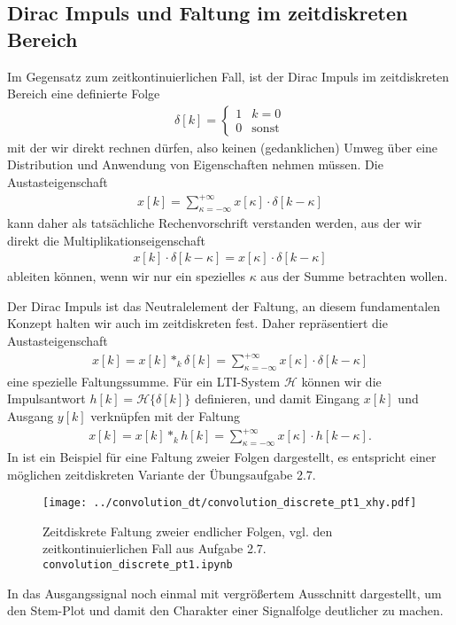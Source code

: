 \subsection*{Dirac Impuls und Faltung im zeitdiskreten Bereich}
Im Gegensatz zum zeitkontinuierlichen Fall, ist der Dirac Impuls im zeitdiskreten
Bereich eine definierte Folge
\begin{align}
\delta[k] =
\begin{cases}
1 & k=0\\
0 & \text{sonst}
\end{cases}
\end{align}
mit der wir direkt rechnen dürfen, also keinen (gedanklichen) Umweg über
eine Distribution und Anwendung von Eigenschaften nehmen müssen.
%
Die Austasteigenschaft
\begin{align}
x[k] = \sum_{\kappa=-\infty}^{+\infty} x[\kappa]
\cdot \delta[k-\kappa]
\end{align}
kann daher als tatsächliche Rechenvorschrift verstanden werden, aus der wir
direkt die Multiplikationseigenschaft
\begin{align}
x[k] \cdot \delta[k-\kappa] = x[\kappa] \cdot \delta[k-\kappa]
\end{align}
ableiten können, wenn wir nur ein spezielles $\kappa$ aus der Summe betrachten
wollen.

Der Dirac Impuls ist das Neutralelement der Faltung, an diesem fundamentalen
Konzept halten wir auch im zeitdiskreten fest. Daher repräsentiert die
Austasteigenschaft
\begin{align}
x[k] = x[k] \ast_k \delta[k] = \sum_{\kappa=-\infty}^{+\infty} x[\kappa]
\cdot \delta[k-\kappa]
\end{align}
eine spezielle Faltungssumme. Für ein LTI-System $\mathcal{H}$ können wir
die Impulsantwort $h[k]=\mathcal{H}\{\delta[k]\}$ definieren, und damit
Eingang $x[k]$ und Ausgang $y[k]$ verknüpfen mit der Faltung
\begin{align}
x[k] = x[k] \ast_k h[k] = \sum_{\kappa=-\infty}^{+\infty} x[\kappa]
\cdot h[k-\kappa].
\end{align}
%
In  ist ein Beispiel für eine Faltung
zweier Folgen dargestellt, es entspricht einer möglichen zeitdiskreten
Variante der Übungsaufgabe 2.7.
%
\begin{figure}[b]
\centering
\texttt{[image: ../convolution\_dt/convolution\_discrete\_pt1\_xhy.pdf]}
\caption{Zeitdiskrete Faltung zweier endlicher Folgen, vgl. den zeitkontinuierlichen
Fall aus Aufgabe 2.7. \texttt{convolution\_discrete\_pt1.ipynb}}
\label{fig:convolution_discrete_pt1_xhy}
\end{figure}
%
In  das Ausgangssignal noch
einmal mit vergrößertem Ausschnitt dargestellt, um den Stem-Plot und damit den
Charakter einer Signalfolge deutlicher zu machen.
%

